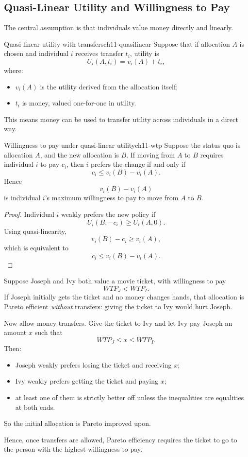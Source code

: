 \subsection{Quasi-Linear Utility and Willingness to Pay}

The central assumption is that individuals value money directly and linearly.

\begin{definition}{Quasi-linear utility with transfers}{ch11-quasilinear}
Suppose that if allocation $A$ is chosen and individual $i$ receives transfer $t_i$, utility is
\[
U_i(A,t_i)=v_i(A)+t_i,
\]
where:
\begin{itemize}
    \item $v_i(A)$ is the utility derived from the allocation itself;
    \item $t_i$ is money, valued one-for-one in utility.
\end{itemize}
\end{definition}

This means money can be used to transfer utility across individuals in a direct way.

\begin{theorem}{Willingness to pay under quasi-linear utility}{ch11-wtp}
Suppose the status quo is allocation $A$, and the new allocation is $B$. If moving from $A$ to $B$ requires individual $i$ to pay $c_i$, then $i$ prefers the change if and only if
\[
c_i \le v_i(B)-v_i(A).
\]
Hence
\[
v_i(B)-v_i(A)
\]
is individual $i$'s maximum willingness to pay to move from $A$ to $B$.
\end{theorem}

\begin{proof}
Individual $i$ weakly prefers the new policy if
\[
U_i(B,-c_i)\ge U_i(A,0).
\]
Using quasi-linearity,
\[
v_i(B)-c_i \ge v_i(A),
\]
which is equivalent to
\[
c_i \le v_i(B)-v_i(A).
\]
\end{proof}

\begin{examplebox}[title={Worked Example: Movie ticket allocation with transfers}]
Suppose Joseph and Ivy both value a movie ticket, with willingness to pay
\[
WTP_J < WTP_I.
\]
If Joseph initially gets the ticket and no money changes hands, that allocation is Pareto efficient \emph{without} transfers: giving the ticket to Ivy would hurt Joseph.

Now allow money transfers. Give the ticket to Ivy and let Ivy pay Joseph an amount $x$ such that
\[
WTP_J \le x \le WTP_I.
\]
Then:
\begin{itemize}
    \item Joseph weakly prefers losing the ticket and receiving $x$;
    \item Ivy weakly prefers getting the ticket and paying $x$;
    \item at least one of them is strictly better off unless the inequalities are equalities at both ends.
\end{itemize}
So the initial allocation is Pareto improved upon.

Hence, once transfers are allowed, Pareto efficiency requires the ticket to go to the person with the highest willingness to pay.
\end{examplebox}

